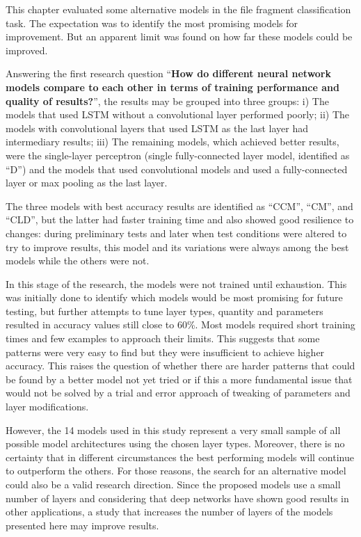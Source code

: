 This chapter evaluated some alternative models in the file fragment classification task. The expectation was to identify the most promising models for improvement. But an apparent limit was found on how far these models could be improved.

Answering the first research question ``\textbf{How do different neural network models compare to each other in terms of training performance and quality of results?}'', 
the results may be grouped into three groups: i) The models that used LSTM without a convolutional layer performed poorly; ii) The models with convolutional layers that used LSTM as the last layer had intermediary results; iii) The remaining models, which achieved better results, were the single-layer perceptron (single fully-connected layer model, identified as ``D'') and the models that used convolutional models and used a fully-connected layer or max pooling as the last layer.

The three models with best accuracy results are identified as ``CCM'', ``CM'', and ``CLD'', but the latter had faster training time and also showed good resilience to changes: during preliminary tests and later when test conditions were altered to try to improve results, this model and its variations were always among the best models while the others were not.

In this stage of the research, the models were not trained until exhaustion.
This was initially done to identify which models would be most promising for future testing, but further attempts to tune layer types, quantity and parameters resulted in accuracy values still close to 60\%.
Most models required short training times and few examples to approach their limits.
This suggests that some patterns were very easy to find but they were insufficient to achieve higher accuracy.
This raises the question of whether there are harder patterns that could be found by a better model not yet tried or if this a more fundamental issue that would not be solved by a trial and error approach of tweaking of parameters and layer modifications.


However, the 14 models used in this study represent a very small sample of all possible model architectures using the chosen layer types. Moreover, there is no certainty that in different circumstances the best performing models will continue to outperform the others. For those reasons, the search for an alternative model could also be a valid research direction. Since the proposed models use a small number of layers and considering that deep networks have shown good results in other applications, a study that increases the number of layers of the models presented here may improve results.

